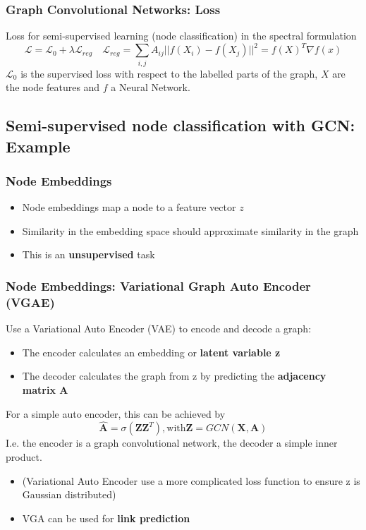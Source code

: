 \subsubsection{Graph Convolutional Networks: Loss}
Loss for semi-supervised learning (node classification) in the spectral formulation
\[
    \mathcal{L} = \mathcal{L}_0 + \lambda \mathcal{L}_{reg} \quad \mathcal{L}_{reg} = \sum_{i,j}A_{ij}||f(X_i)- f(X_j)||^2 = f(X)^T\nabla f(x)
\]
\(\mathcal{L}_0\) is the supervised loss with respect to the labelled parts of the graph, \(X\) are the node features and \(f\) a Neural Network.

\subsection{Semi-supervised node classification with GCN: Example}
\subsubsection{Node Embeddings}
\begin{itemize}
    \item Node embeddings map a node to a feature vector \(z\)
    \item Similarity in the embedding space should approximate similarity in the graph
    \item This is an \textbf{unsupervised} task
\end{itemize}
\subsubsection*{Node Embeddings: Variational Graph Auto Encoder (VGAE)}
Use a Variational Auto Encoder (VAE) to encode and decode a graph:
\begin{itemize}
    \item The encoder calculates an embedding or \textbf{latent variable z}
    \item The decoder calculates the graph from z by predicting the \textbf{adjacency matrix A}
\end{itemize}
For a simple auto encoder, this can be achieved by
\[
\hat{\mathbf{A}} = \sigma(\mathbf{Z}\mathbf{Z}^T), \text{with} \mathbf{Z} = GCN(\mathbf{X},\mathbf{A})
\]
I.e. the encoder is a graph convolutional network, the decoder a simple inner product.
\begin{itemize}
    \item (Variational Auto Encoder use a more complicated loss function to ensure z is Gaussian distributed)
    \item VGA can be used for \textbf{link prediction}
\end{itemize}

